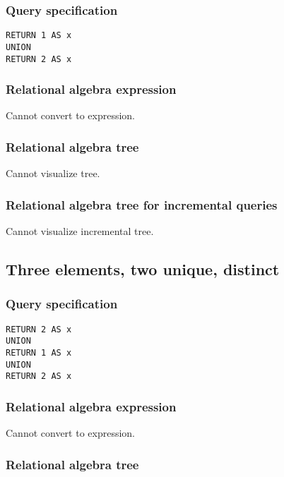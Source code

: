 \subsubsection*{Query specification}

\begin{lstlisting}
RETURN 1 AS x
UNION
RETURN 2 AS x
\end{lstlisting}

\subsubsection*{Relational algebra expression}

Cannot convert to expression.

\subsubsection*{Relational algebra tree}

Cannot visualize tree.

\subsubsection*{Relational algebra tree for incremental queries}

Cannot visualize incremental tree.

\subsection{Three elements, two unique, distinct}

\subsubsection*{Query specification}

\begin{lstlisting}
RETURN 2 AS x
UNION
RETURN 1 AS x
UNION
RETURN 2 AS x
\end{lstlisting}

\subsubsection*{Relational algebra expression}

Cannot convert to expression.

\subsubsection*{Relational algebra tree}

